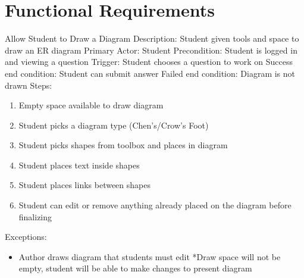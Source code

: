 
    \chapter{Functional Requirements}
    \begin{section}{Allow Student to Draw a Diagram}
        Description: Student given tools and space to draw an ER diagram \newline
        Primary Actor: Student \newline
        Precondition: Student is logged in and viewing a            question \newline
        Trigger: Student chooses a question to work on \newline
        Success end condition: Student can submit answer            \newline
        Failed end condition: Diagram is not drawn \newline
        \newline
        Steps:
        \begin{enumerate}
            \item{Empty space available to draw diagram}
            \item{Student picks a diagram type (Chen's/Crow's Foot)}
            \item{Student picks shapes from toolbox and places in           diagram}
            \item{Student places text inside shapes}
            \item{Student places links between shapes}
            \item{Student can edit or remove anything already placed on the diagram before finalizing}
        \end{enumerate}
        Exceptions:
        \begin{itemize}
            \item{Author draws diagram that students must edit             \newline
                *Draw space will not be empty, student will be able to           make changes to present diagram}
        \end{itemize}
    \end{section}

